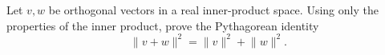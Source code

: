 \begin{exercise}
  \label{ex:lec08:pythagorean-theorem}
  Let \(v,w\) be orthogonal vectors in a real inner-product space.
  Using only the properties of the inner product, prove the Pythagorean
  identity
  \[
    \lVert v+w\rVert^2=\lVert v\rVert^2+\lVert w\rVert^2.
  \]
\end{exercise}
